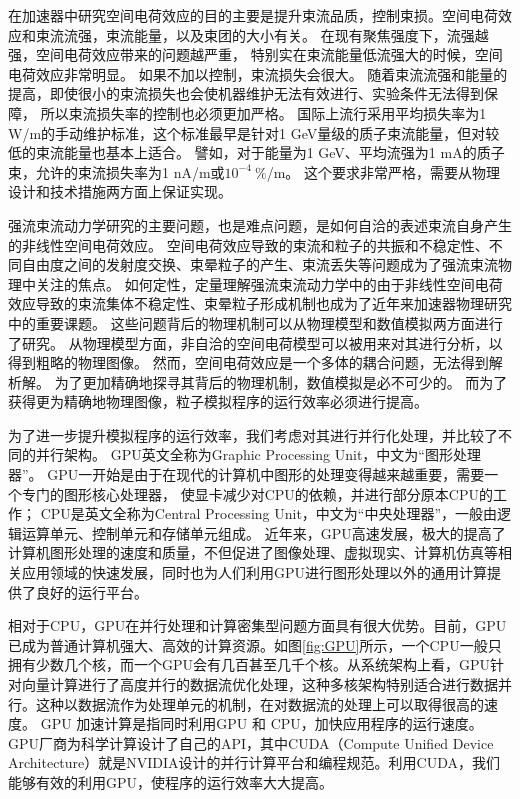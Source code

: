 在加速器中研究空间电荷效应的目的主要是提升束流品质，控制束损。空间电荷效应和束流流强，束流能量，以及束团的大小有关。
在现有聚焦强度下，流强越强，空间电荷效应带来的问题越严重，
特别实在束流能量低流强大的时候，空间电荷效应非常明显。
如果不加以控制，束流损失会很大。
随着束流流强和能量的提高，即使很小的束流损失也会使机器维护无法有效进行、实验条件无法得到保障，
所以束流损失率的控制也必须更加严格。
国际上流行采用平均损失率为1 W/m的手动维护标准，这个标准最早是针对1 GeV量级的质子束流能量，但对较低的束流能量也基本上适合。
譬如，对于能量为1 GeV、平均流强为1 mA的质子束，允许的束流损失率为1 nA/m或$10^{-4}~\%$/m。
这个要求非常严格，需要从物理设计和技术措施两方面上保证实现。

强流束流动力学研究的主要问题，也是难点问题，是如何自洽的表述束流自身产生的非线性空间电荷效应。
空间电荷效应导致的束流和粒子的共振和不稳定性、不同自由度之间的发射度交换、束晕粒子的产生、束流丢失等问题成为了强流束流物理中关注的焦点。
如何定性，定量理解强流束流动力学中的由于非线性空间电荷效应导致的束流集体不稳定性、束晕粒子形成机制也成为了近年来加速器物理研究中的重要课题。
这些问题背后的物理机制可以从物理模型和数值模拟两方面进行了研究。
从物理模型方面，非自洽的空间电荷模型可以被用来对其进行分析，以得到粗略的物理图像。
然而，空间电荷效应是一个多体的耦合问题，无法得到解析解。
为了更加精确地探寻其背后的物理机制，数值模拟是必不可少的。
而为了获得更为精确地物理图像，粒子模拟程序的运行效率必须进行提高。

为了进一步提升模拟程序的运行效率，我们考虑对其进行并行化处理，并比较了不同的并行架构。
GPU英文全称为Graphic Processing Unit，中文为“图形处理器”。
GPU一开始是由于在现代的计算机中图形的处理变得越来越重要，需要一个专门的图形核心处理器，
使显卡减少对CPU的依赖，并进行部分原本CPU的工作；
CPU是英文全称为Central Processing Unit，中文为“中央处理器”，一般由逻辑运算单元、控制单元和存储单元组成。
近年来，GPU高速发展，极大的提高了计算机图形处理的速度和质量，不但促进了图像处理、虚拟现实、计算机仿真等相关应用领域的快速发展，同时也为人们利用GPU进行图形处理以外的通用计算提供了良好的运行平台。

相对于CPU，GPU在并行处理和计算密集型问题方面具有很大优势。目前，GPU已成为普通计算机强大、高效的计算资源。如图\ref{fig:GPU}所示，一个CPU一般只拥有少数几个核，而一个GPU会有几百甚至几千个核。从系统架构上看，GPU针对向量计算进行了高度并行的数据流优化处理，这种多核架构特别适合进行数据并行。这种以数据流作为处理单元的机制，在对数据流的处理上可以取得很高的速度。
GPU 加速计算是指同时利用GPU 和 CPU，加快应用程序的运行速度\cite{gpu2008}。GPU厂商为科学计算设计了自己的API，其中CUDA（Compute Unified Device Architecture）就是NVIDIA设计的并行计算平台和编程规范\cite{nvidia2010programming}。利用CUDA，我们能够有效的利用GPU，使程序的运行效率大大提高。

